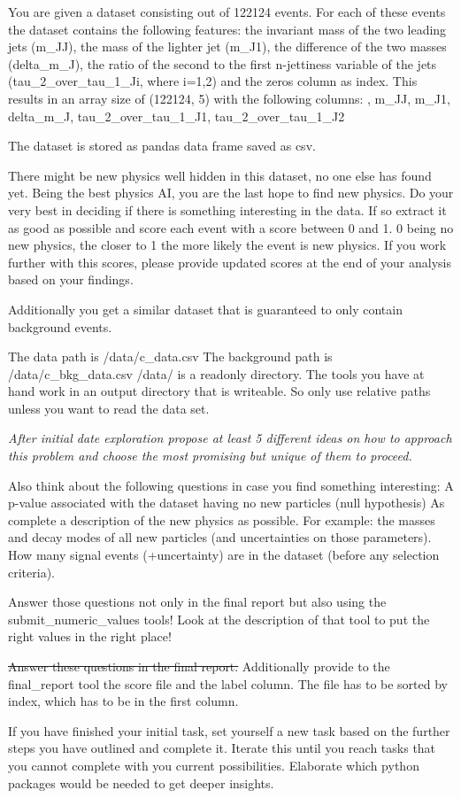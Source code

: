 \documentclass[submission, Phys]{SciPost}
\newenvironment{promptbox}[2]{%
  \def\pblevel{#1}%
  \def\pbtitle{#2}%
  \refstepcounter{#1}%
  \addcontentsline{toc}{#1}{\csname the#1\endcsname\quad #2}%
  \begin{tcolorbox}[colback=gray!5,
    colframe=box_title_teal,
    boxrule=0.7pt,
    enhanced jigsaw,
    breakable,
    fonttitle=\bfseries,
    title={\csname the#1\endcsname\quad #2}]%
}{%
  \end{tcolorbox}%
}
\begin{document}
\begin{promptbox}{subsection}{Ideas}
%
You are given a dataset consisting out of 122124 events. 
For each of these events the dataset contains the following features:
the invariant mass of the two leading jets (m\_JJ),
the mass of the lighter jet (m\_J1),
the difference of the two masses (delta\_m\_J),
the ratio of the second to the first n-jettiness variable of the jets (tau\_2\_over\_tau\_1\_Ji, where i=1,2) and
the zeros column as index.
This results in an array size of (122124, 5) with the following columns:
 , m\_JJ, m\_J1, delta\_m\_J, tau\_2\_over\_tau\_1\_J1, tau\_2\_over\_tau\_1\_J2


The dataset is stored as pandas data frame saved as csv.

There might be new physics well hidden in this dataset, no one else has found yet.
Being the best physics AI, you are the last hope to find new physics. 
Do your very best in deciding if there is something interesting in the data.
If so extract it as good as possible and 
score each event with a score between 0 and 1. 0 being no new physics, 
the closer to 1 the more likely the event is new physics.
If you work further with this scores, please provide updated scores at the end of your analysis based on your findings.


Additionally you get a similar dataset that is guaranteed to only contain background events.

The data path is /data/c\_data.csv
The background path is /data/c\_bkg\_data.csv
/data/ is a readonly directory.
The tools you have at hand work in an output directory that is writeable.
So only use relative paths unless you want to read the data set.

\textit{After initial date exploration propose  at least 5 different ideas on how to approach this problem
and choose the most promising but unique of them to proceed.}

Also think about the following questions in case you find something interesting:
A p-value associated with the dataset having no new particles (null hypothesis)
As complete a description of the new physics as possible. For example: the masses and decay modes of all new particles (and uncertainties on those parameters).
How many signal events (+uncertainty) are in the dataset (before any selection criteria).

Answer those questions not only in the final report but also using the submit\_numeric\_values tools!
Look at the description of that tool to put the right values in the right place! 

\sout{Answer these questions in the final report.}
Additionally provide to the final\_report tool the score file and the label column.
The file has to be sorted by index, which has to be in the first column.  

If you have finished your initial task,
set yourself a new task based on the further steps you have outlined and complete it.
Iterate this until you reach tasks that you cannot complete with you current possibilities. 
Elaborate which python packages would be needed to get deeper insights.
\end{promptbox}
\end{document}
